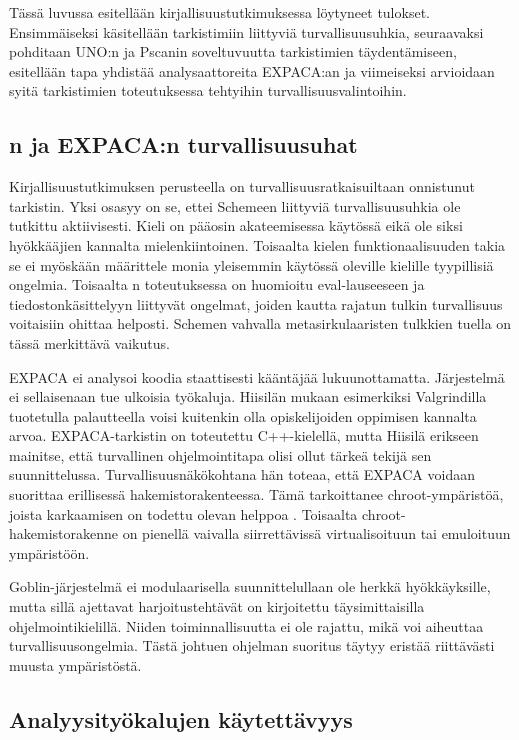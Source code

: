 Tässä luvussa esitellään kirjallisuustutkimuksessa löytyneet tulokset.
Ensimmäiseksi käsitellään tarkistimiin liittyviä turvallisuusuhkia,
seuraavaksi pohditaan UNO:n ja Pscanin soveltuvuutta tarkistimien
täydentämiseen, esitellään tapa yhdistää analysaattoreita EXPACA:an ja
viimeiseksi arvioidaan syitä tarkistimien toteutuksessa tehtyihin
turvallisuusvalintoihin.

\subsection{\scmrobo n ja EXPACA:n turvallisuusuhat}

Kirjallisuustutkimuksen perusteella {\scmrobo} on turvallisuusratkaisuiltaan
onnistunut tarkistin. Yksi osasyy on se, ettei Schemeen liittyviä
turvallisuusuhkia ole tutkittu aktiivisesti. Kieli on pääosin akateemisessa
käytössä eikä ole siksi hyökkääjien kannalta mielenkiintoinen. Toisaalta kielen
funktionaalisuuden takia se ei myöskään määrittele monia yleisemmin käytössä
oleville kielille tyypillisiä ongelmia. Toisaalta \scmrobo n toteutuksessa on
huomioitu eval-lauseeseen ja tiedostonkäsittelyyn liittyvät ongelmat, joiden
kautta rajatun tulkin turvallisuus voitaisiin ohittaa helposti. Schemen vahvalla
metasirkulaaristen tulkkien tuella on tässä merkittävä vaikutus.

EXPACA ei analysoi koodia staattisesti kääntäjää lukuunottamatta. Järjestelmä ei
sellaisenaan tue ulkoisia työkaluja. Hiisilän mukaan esimerkiksi Valgrindilla
tuotetulla palautteella voisi kuitenkin olla opiskelijoiden oppimisen kannalta
arvoa. EXPACA-tarkistin on toteutettu C++-kielellä, mutta Hiisilä erikseen
mainitse, että turvallinen ohjelmointitapa olisi ollut tärkeä tekijä sen
suunnittelussa. Turvallisuusnäkökohtana hän toteaa, että EXPACA voidaan
suorittaa erillisessä hakemistorakenteessa. \citep{Hiisila2005} Tämä
tarkoittanee chroot-ympäristöä, joista karkaamisen on todettu olevan helppoa
\citep{Simes}. Toisaalta chroot-hakemistorakenne on pienellä vaivalla
siirrettävissä virtualisoituun tai emuloituun ympäristöön. 

Goblin-järjestelmä ei modulaarisella suunnittelullaan ole herkkä hyökkäyksille,
mutta sillä ajettavat harjoitustehtävät on kirjoitettu täysimittaisilla
ohjelmointikielillä. Niiden toiminnallisuutta ei ole rajattu, mikä voi
aiheuttaa turvallisuusongelmia. Tästä johtuen ohjelman suoritus täytyy eristää
riittävästi muusta ympäristöstä.

\subsection{Analyysityökalujen käytettävyys}

